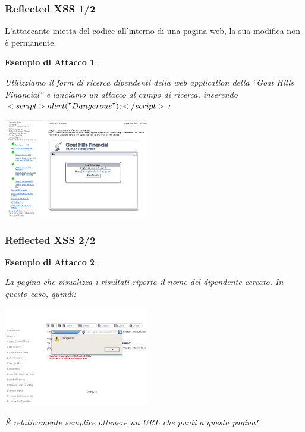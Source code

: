 \documentclass{beamer}
\newtheorem{myexample}{Esempio di Attacco}
\begin{document}
\begin{frame}
  \frametitle{Reflected XSS 1/2}
  L'attaccante inietta del codice all'interno di una pagina web, la sua modifica non \`e permanente.
  \pause
  \begin{myexample}
    \begin{tiny}
      Utilizziamo il form di ricerca dipendenti della web application della ``Goat Hills Financial'' e lanciamo un attacco al campo di ricerca, inserendo $<script>alert("Dangerous"); </script>$:
      \begin{center}
	\includegraphics[width=180pt]{images/xss_reflected_1.png}
      \end{center}
    \end{tiny}
  \end{myexample}
\end{frame}

\begin{frame}
  \frametitle{Reflected XSS 2/2}
  \begin{myexample}
    \begin{tiny}
      La pagina che visualizza i risultati riporta il nome del dipendente cercato. In questo caso, quindi:
      \begin{center}
	\includegraphics[width=180pt]{images/xss_reflected_2.png}
      \end{center}
      \alert{\`E relativamente semplice ottenere un URL che punti a questa pagina!}
    \end{tiny}
  \end{myexample}
\end{frame}
\end{document}
